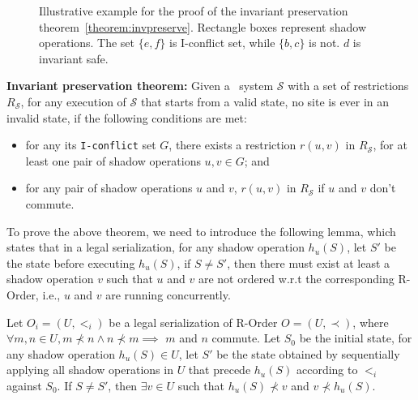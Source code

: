 \begin{figure}[t!]
\begin{minipage}[t]{0.5\textwidth}
\end{minipage}
\caption{Illustrative example for the proof of the invariant preservation theorem~\ref{theorem:invpreserve}. Rectangle boxes represent
shadow operations. The set $\{e, f\}$ is I-conflict set, while $\{b, c\}$ is not. $d$ is invariant safe.}
\label{fig:invarexample}
\end{figure}
\fi

\begin{theorem}
{\bf Invariant preservation theorem:} Given a \PRCAJ\ system $\mathscr{S}$
with a set of restrictions
$R_{\mathscr{S}}$, for any execution of $\mathscr{S}$ that starts from a valid state, no site
is ever in an invalid state, if the following conditions are met:
\begin{itemize}
 \item for any its {\tt I-conflict} set $G$, there exists
a restriction $r(u, v)$ in $R_{\mathscr{S}}$, for at least one pair of shadow operations $u, v \in G$; and
 \item for any pair of shadow operations $u$ and $v$, $r(u, v)$ in  $R_{\mathscr{S}}$ if $u$ and $v$ don't commute.
\end{itemize}

\label{theorem:invpreserve}
\end{theorem}
To prove the above theorem, we need to introduce the following lemma, which states that
in a legal serialization, for any shadow operation $h_u(S)$, let $S'$ be the state before
executing $h_u(S)$, if $S \neq S'$, then there must exist at least a shadow operation $v$ such that
$u$ and $v$ are not ordered w.r.t the corresponding R-Order, i.e., $u$ and $v$ are running concurrently.

\begin{lemma}\label{lem:concurrentexists}
Let $O_i=(U,<_i)$ be  a legal serialization of R-Order $O=(U,\prec)$, 
where $\forall m, n\in U, m\not\prec n \wedge n\not\prec m \implies $ $m$ and $n$
commute. Let $S_0$ be the initial state, for any
shadow operation $h_u(S) \in U$, let $S'$ be the state obtained by sequentially applying all shadow
operations in $U$ that precede $h_u(S)$ according to $<_i$ against $S_0$.
If $S \neq S'$, then $\exists v\in U$ such that $h_u(S)\not\prec v$ and $v\not\prec h_u(S)$.
\end{lemma}

